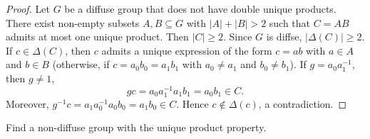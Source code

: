 \begin{proof}
    Let $G$ be a diffuse group that does not have double unique products. 
    There exist non-empty subsets $A,B\subseteq G$ with $|A|+|B|>2$ such that 
	$C=AB$ admits at most one unique product. Then $|C|\geq2$. Since $G$ is diffse, 
	$|\Delta(C)|\geq2$. If $c\in\Delta(C)$, then $c$ admits a unique 
	expression of the form $c=ab$ with $a\in A$ and $b\in B$ (otherwise, if 
	$c=a_0b_0=a_1b_1$ with $a_0\ne a_1$ and $b_0\ne b_1$). If $g=a_0a_1^{-1}$,
	then $g\ne 1$, 
	\[
	gc=a_0a_1^{-1}a_1b_1=a_0b_1\in C.
	\]
	Moreover, 
	$g^{-1}c=a_1a_0^{-1}a_0b_0=a_1b_0\in C$. Hence $c\not\in\Delta(c)$, a contradiction.
\end{proof}

\begin{problem}
	Find a non-diffuse group with the unique product property.
\end{problem}

%
%
%
%
%
%
%
%	

